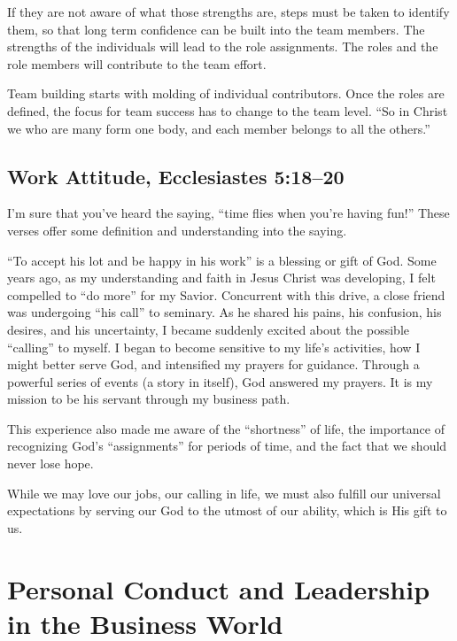 \documentclass[12pt]{memoir}
\begin{document}
If they are not aware of what those strengths are, steps must be taken
to identify them, so that long term confidence can be built into the
team members. The strengths of the individuals will lead to the role
assignments. The roles and the role members will contribute to the
team effort.

Team building starts with molding of individual contributors. Once
the roles are defined, the focus for team success has to change to
the team level. ``So in Christ we who are many form one body, and
each member belongs to all the others.''

\section[Work Attitude]{Work Attitude, Ecclesiastes 5:18--20}

I'm sure that you've heard the saying, ``time flies when you're having fun!'' These verses offer some definition and understanding into the saying.

``To accept his lot and be happy in his work'' is a blessing or gift of God.
Some years ago, as my understanding and faith in Jesus Christ was
developing, I felt compelled to ``do more'' for my Savior. Concurrent
with this drive, a close friend was undergoing ``his call'' to seminary.
As he shared his pains, his confusion, his desires, and his uncertainty,
I became suddenly excited about the possible ``calling'' to myself.
I began to become sensitive to my life's activities, how I might better
serve God, and intensified my prayers for guidance. Through a powerful
series of events (a story in itself), God answered my prayers. It
is my mission to be his servant through my business path.

This experience also made me aware of the ``shortness'' of life,
the importance of recognizing God's ``assignments'' for periods
of time, and the fact that we should never lose hope.

While we may love our jobs, our calling in life, we must also fulfill
our universal expectations by serving our God to the utmost of our
ability, which is His gift to us.


\chapter{Personal Conduct and Leadership in the Business World}
\end{document}
